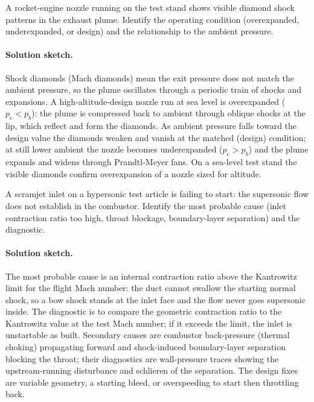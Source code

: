 \begin{exercise}
A rocket-engine nozzle running on the test stand shows visible
diamond shock patterns in the exhaust plume. Identify the
operating condition (overexpanded, underexpanded, or design) and
the relationship to the ambient pressure.
\paragraph{Solution sketch.} Shock diamonds (Mach diamonds) mean the
exit pressure does not match the ambient pressure, so the plume
oscillates through a periodic train of shocks and expansions. A
high-altitude-design nozzle run at sea level is overexpanded
($p_e < p_b$): the plume is compressed back to ambient through oblique
shocks at the lip, which reflect and form the diamonds. As ambient
pressure falls toward the design value the diamonds weaken and vanish
at the matched (design) condition; at still lower ambient the nozzle
becomes underexpanded ($p_e > p_b$) and the plume expands and widens
through Prandtl-Meyer fans. On a sea-level test stand the visible
diamonds confirm overexpansion of a nozzle sized for altitude.
\end{exercise}

\begin{exercise}
A scramjet inlet on a hypersonic test article is failing to start:
the supersonic flow does not establish in the combustor. Identify
the most probable cause (inlet contraction ratio too high, throat
blockage, boundary-layer separation) and the diagnostic.
\paragraph{Solution sketch.} The most probable cause is an internal
contraction ratio above the Kantrowitz limit for the flight Mach
number: the duct cannot swallow the starting normal shock, so a bow
shock stands at the inlet face and the flow never goes supersonic
inside. The diagnostic is to compare the geometric contraction ratio
to the Kantrowitz value at the test Mach number; if it exceeds the
limit, the inlet is unstartable as built. Secondary causes are
combustor back-pressure (thermal choking) propagating forward and
shock-induced boundary-layer separation blocking the throat; their
diagnostics are wall-pressure traces showing the upstream-running
disturbance and schlieren of the separation. The design fixes are
variable geometry, a starting bleed, or overspeeding to start then
throttling back.
\end{exercise}


